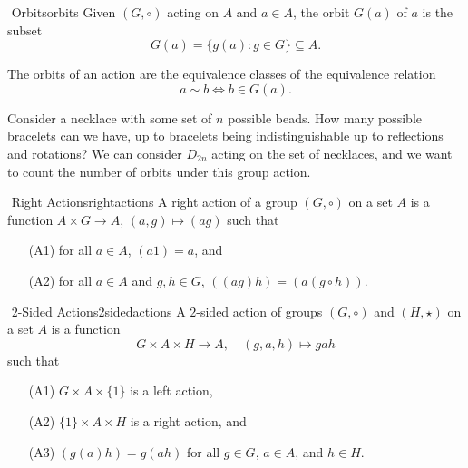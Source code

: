         \begin{definition}{\Stop\,\,Orbits}{orbits}
            Given \((G,\circ)\) acting on \(A\) and \(a\in A\), the orbit \(G(a)\) of \(a\) is the subset
            \begin{equation*}
                G(a)=\{g(a):g\in G\}\subseteq A.
            \end{equation*}
        \end{definition}
        \begin{remark*}
            The orbits of an action are the equivalence classes of the equivalence relation
            \begin{equation*}
                a\sim b\iff b\in G(a).
            \end{equation*}
        \end{remark*}
        \begin{example}
            Consider a necklace with some set of \(n\) possible beads. How many possible bracelets can we have, up to bracelets being indistinguishable up to reflections and rotations? We can consider \(D_{2n}\) acting on the set of necklaces, and we want to count the number of orbits under this group action.
        \end{example}
        \begin{definition}{\Stop\,\,Right Actions}{rightactions}
            A right action of a group \((G,\circ)\) on a set \(A\) is a function \(A\times G\to A\), \((a,g)\mapsto (ag)\) such that
            \begin{enumerate}
                \item[(A1)] for all \(a\in A\), \((a1)=a\), and
                \item[(A2)] for all \(a\in A\) and \(g,h\in G\), \(((ag)h)=(a(g\circ h))\).
            \end{enumerate}
        \end{definition}
        \begin{definition}{\Stop\,\,\(2\)-Sided Actions}{2sidedactions}
           A \(2\)-sided action of groups \((G,\circ)\) and \((H,\star)\) on a set \(A\) is a function
           \begin{equation*}
            G\times A\times H\to A,\quad (g,a,h)\mapsto gah
           \end{equation*}
           such that 
           \begin{enumerate}
                \item[(A1)] \(G\times A\times\{1\}\) is a left action,
                \item[(A2)] \(\{1\}\times A\times H\) is a right action, and
                \item[(A3)] \((g(a)h)=g(ah)\) for all \(g\in G\), \(a\in A\), and \(h\in H\).
            \end{enumerate}
        \end{definition}
